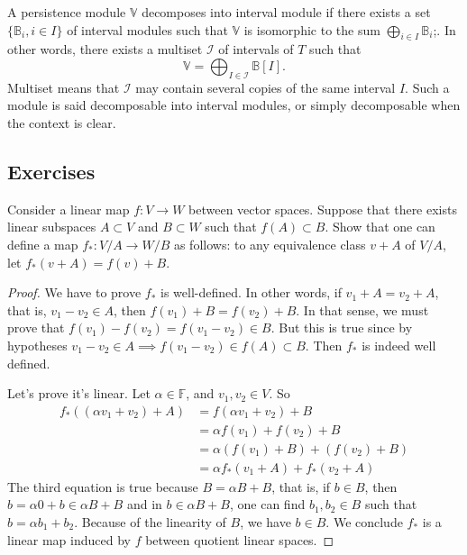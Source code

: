 \begin{definition}
    A persistence module $\mathbb{V}$ decomposes into interval module if there
    exists a set $\{\mathbb{B}_i, i \in I\}$ of interval modules such that
    $\mathbb{V}$ is isomorphic to the sum $\bigoplus_{i \in I} \mathbb{B}_i$;.
    In other words, there exists a multiset $\mathcal{I}$ of intervals of $T$
    such that
    $$\mathbb{V} = \bigoplus_{I\in \mathcal{I}} \mathbb{B}[I].$$
    Multiset means that $\mathcal{I}$ may contain several copies of the same
    interval $I$. 
    Such a module is said decomposable into interval modules, or simply
    decomposable when the context is clear.
\end{definition}

\subsection{Exercises}

\begin{exercise}
    Consider a linear map $f : V \to W$ between vector spaces. Suppose that
    there exists linear subspaces $A \subset V$ and $B \subset W$ such that
    $f(A) \subset B$. Show that one can define a map $f_* : V /A \to W/B $ as
    follows: to any equivalence class $v + A$ of $V /A$, let $f_*(v + A) = f(v) + B$.
\end{exercise}

\begin{proof}
    We have to prove $f_*$ is well-defined. In other words, if $v_1 + A = v_2 + A$, that
    is, $v_1 - v_2 \in A$, then $f(v_1) + B = f(v_2) + B$. In that sense, we must
    prove that $f(v_1) - f(v_2) = f(v_1 - v_2) \in B$. But this is true since by
    hypotheses $v_1 - v_2 \in A \implies f(v_1 - v_2) \in f(A) \subset B$. Then
    $f_*$ is indeed well defined. 

    Let's prove it's linear. Let $\alpha \in \mathbb{F}$, and $v_1, v_2 \in V$. So
    \begin{equation*}
        \begin{split}
            f_*((\alpha v_1 + v_2) + A) &= f(\alpha v_1 + v_2) + B \\
            &= \alpha f(v_1) + f(v_2) + B \\
            &= \alpha(f(v_1) + B) + (f(v_2) + B) \\
            &= \alpha f_*(v_1 + A) + f_*(v_2 + A)
        \end{split}
    \end{equation*}
    The third equation is true because $B = \alpha B + B$, that is, if $b \in B$,
    then $b = \alpha 0 + b \in \alpha B + B$ and in $b \in \alpha B + B$, one can
    find $b_1, b_2 \in B$ such that $b = \alpha b_1 + b_2$. Because of the
    linearity of $B$, we have $b \in B$.  We conclude $f_*$ is a linear map
    induced by $f$ between quotient linear spaces.     
\end{proof}

